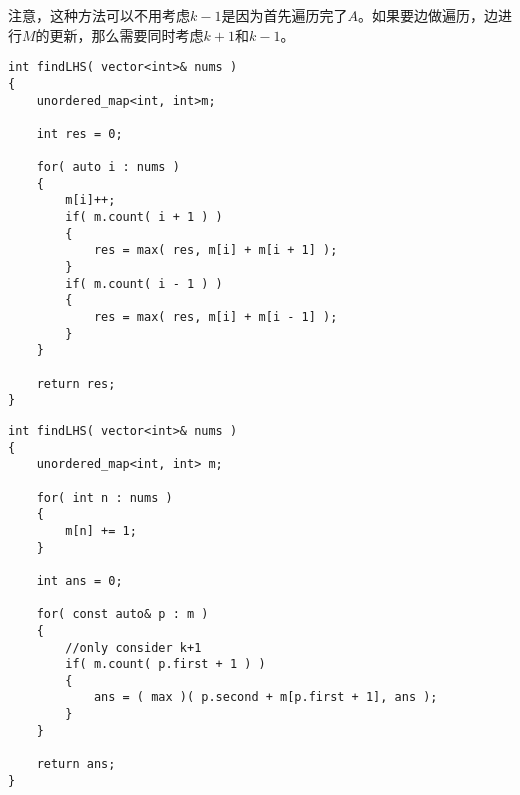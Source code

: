 注意，这种方法可以不用考虑$k-1$是因为首先遍历完了$A$。如果要边做遍历，边进行$M$的更新，那么需要同时考虑$k+1$和$k-1$。
\setcounter{lstlisting}{0}
\begin{lstlisting}[style=customc, caption={Hash Map With One Pass}]
int findLHS( vector<int>& nums )
{
    unordered_map<int, int>m;
	
    int res = 0;
	
    for( auto i : nums )
    {
        m[i]++;
        if( m.count( i + 1 ) )
        {
            res = max( res, m[i] + m[i + 1] );
        }
        if( m.count( i - 1 ) )
        {
            res = max( res, m[i] + m[i - 1] );
        }
    }
	
    return res;
}
\end{lstlisting}

\begin{lstlisting}[style=customc, caption={Hash Map With TWo Pass}]
int findLHS( vector<int>& nums )
{
    unordered_map<int, int> m;

    for( int n : nums )
    {
        m[n] += 1;
    }

    int ans = 0;

    for( const auto& p : m )
    {
        //only consider k+1
        if( m.count( p.first + 1 ) )
        {
            ans = ( max )( p.second + m[p.first + 1], ans );
        }
    }

    return ans;
}
\end{lstlisting}